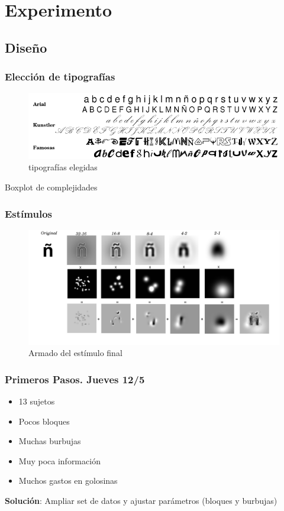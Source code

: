 \documentclass{beamer}
\begin{document}
\section{Experimento}
  \subsection{Dise\~no}

	\begin{frame}
	\frametitle{Elecci\'on de tipograf\'ias}
	\begin{figure}
	\includegraphics[width=\textwidth]{graficos/letras.png}
	\caption{tipograf\'ias elegidas}
	\end{figure}
	Boxplot de complejidades
	\end{frame}

	\begin{frame}
	\frametitle{Est\'imulos}
	\begin{figure}
	\includegraphics[width=\textwidth]{graficos/estimulofinal.png}
	\caption{Armado del est\'imulo final}
	\end{figure}
	\end{frame}

	\begin{frame}
	\frametitle{Primeros Pasos. Jueves 12/5}
	\begin{itemize}
	\item 13 sujetos
	\item Pocos bloques
	\item Muchas burbujas
	\item Muy poca información \pause
	\item Muchos gastos en golosinas\pause
	\end{itemize}
	\textbf{Solución}: Ampliar set de datos y ajustar parámetros (bloques y burbujas)
	\end{frame}
\end{document}
